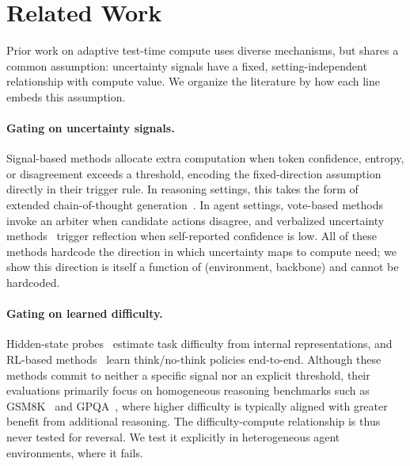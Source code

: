 \section{Related Work}
\label{sec:related}
Prior work on adaptive test-time compute uses diverse mechanisms, but shares a common assumption: uncertainty signals have a fixed, setting-independent relationship with compute value. We organize the literature by how each line embeds this assumption.

\paragraph{Gating on uncertainty signals.}
Signal-based methods allocate extra computation when token confidence, entropy, or disagreement exceeds a threshold, encoding the fixed-direction assumption directly in their trigger rule. In reasoning settings, this takes the form of extended chain-of-thought generation~\cite{seag2025, cats2025, corefine2026, thinkjustenough2025, s1_2025, han2025tokenbudget}. In agent settings, vote-based methods~\cite{catts2026} invoke an arbiter when candidate actions disagree, and verbalized uncertainty methods~\cite{auq2026} trigger reflection when self-reported confidence is low. All of these methods hardcode the direction in which uncertainty maps to compute need; we show this direction is itself a function of (environment, backbone) and cannot be hardcoded.

\paragraph{Gating on learned difficulty.}
Hidden-state probes~\cite{diffadapt2025, zhu2025llmalreadyknows} estimate task difficulty from internal representations, and RL-based methods~\cite{adaptthink2025, thinkless2025, aggarwal2025l1, paglieri2025learning} learn think/no-think policies end-to-end. Although these methods commit to neither a specific signal nor an explicit threshold, their evaluations primarily focus on homogeneous reasoning benchmarks such as GSM8K~\cite{DBLP:journals/corr/abs-2110-14168} and GPQA~\cite{DBLP:journals/corr/abs-2311-12022}, where higher difficulty is typically aligned with greater benefit from additional reasoning. The difficulty-compute relationship is thus never tested for reversal. We test it explicitly in heterogeneous agent environments, where it fails.

